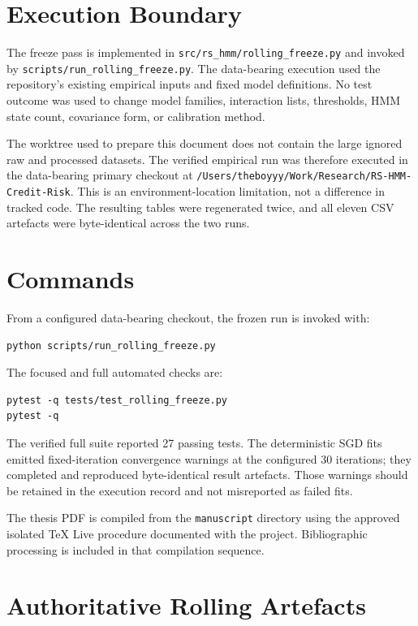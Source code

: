 \section{Execution Boundary}

The freeze pass is implemented in \texttt{src/rs\_hmm/rolling\_freeze.py} and invoked by \texttt{scripts/run\_rolling\_freeze.py}. The data-bearing execution used the repository's existing empirical inputs and fixed model definitions. No test outcome was used to change model families, interaction lists, thresholds, HMM state count, covariance form, or calibration method.

The worktree used to prepare this document does not contain the large ignored raw and processed datasets. The verified empirical run was therefore executed in the data-bearing primary checkout at \texttt{/Users/theboyyy/Work/Research/RS-HMM-Credit-Risk}. This is an environment-location limitation, not a difference in tracked code. The resulting tables were regenerated twice, and all eleven CSV artefacts were byte-identical across the two runs.

\section{Commands}

From a configured data-bearing checkout, the frozen run is invoked with:

\begin{verbatim}
python scripts/run_rolling_freeze.py
\end{verbatim}

The focused and full automated checks are:

\begin{verbatim}
pytest -q tests/test_rolling_freeze.py
pytest -q
\end{verbatim}

The verified full suite reported 27 passing tests. The deterministic SGD fits emitted fixed-iteration convergence warnings at the configured 30 iterations; they completed and reproduced byte-identical result artefacts. Those warnings should be retained in the execution record and not misreported as failed fits.

The thesis PDF is compiled from the \texttt{manuscript} directory using the approved isolated TeX Live procedure documented with the project. Bibliographic processing is included in that compilation sequence.

\section{Authoritative Rolling Artefacts}

